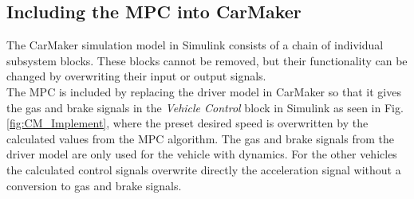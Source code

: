 \documentclass[letterpaper,10pt,conference]{ieeeconf}
\begin{document}
\subsection{Including the MPC into CarMaker}
The CarMaker simulation model in Simulink consists of a chain of individual subsystem blocks. These blocks cannot be removed, but their functionality can be changed by overwriting their input or output signals.\\ \indent
The MPC is included by replacing the driver model in CarMaker so that
it gives the gas and brake signals in the \textit{Vehicle Control}
block in Simulink as seen in Fig. \ref{fig:CM_Implement}, where the
preset desired speed is overwritten by the calculated values from the
MPC algorithm. The gas and brake signals from the driver model are
only used for the vehicle with dynamics. For the other vehicles the calculated control signals overwrite directly the acceleration signal without a conversion to gas and brake signals.

\end{document}
